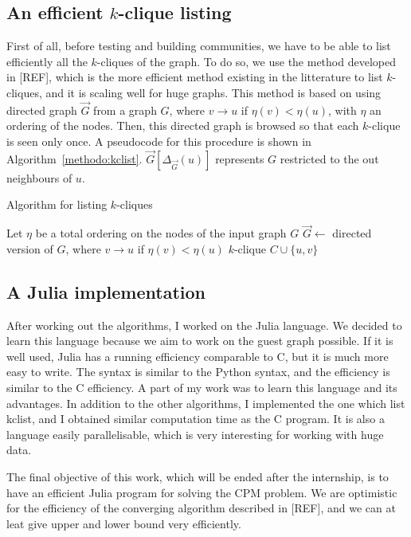 \subsection{An efficient $k$-clique listing}

First of all, before testing and building communities, we have to be able to list efficiently all the $k$-cliques of the graph. To do so, we use the method developed in [REF], which is the more efficient method existing in the litterature to list $k$-cliques, and it is scaling well for huge graphs. This method is based on using directed graph $\vec{G}$ from a graph $G$, where $v \rightarrow u$ if $\eta(v)<\eta(u)$, with $\eta$ an ordering of the nodes. Then, this directed graph is browsed so that each $k$-clique is seen only once. A pseudocode for this procedure is shown in Algorithm~\ref{methodo:kclist}. $\vec{G}[\Delta_{\vec{G}}(u)]$ represents $G$ restricted to the out neighbours of $u$. 

\begin{algorithm}[!htbp]
  \caption{Algorithm for listing $k$-cliques}
  \label{methodo:kclist}
  \begin{algorithmic}[1]
    \State Let $\eta$ be a total ordering on the nodes of the input graph $G$
    \State $\vec{G} \leftarrow$ directed version of $G$, where $v \rightarrow u$ if $\eta(v)<\eta(u)$ 
    \State {}
    \Output $k$-clique $C \cup \{u,v\}$
    \EndFor
    \Else
    \State {}
    \EndFor
    \EndIf
    \EndFunction
  \end{algorithmic}
\end{algorithm}

\subsection{A Julia implementation}

After working out the algorithms, I worked on the Julia language. We decided to learn this language because we aim to work on the guest graph possible. If it is well used, Julia has a running efficiency comparable to C, but it is much more easy to write. The syntax is similar to the Python syntax, and the efficiency is similar to the C efficiency. A part of my work was to learn this language and its advantages. In addition to the other algorithms, I implemented the one which list kclist, and I obtained similar computation time as the C program. It is also a language easily parallelisable, which is very interesting for working with huge data.

The final objective of this work, which will be ended after the internship, is to have an efficient Julia program for solving the CPM problem. We are optimistic for the efficiency of the converging algorithm described in [REF], and we can at leat give upper and lower bound very efficiently.